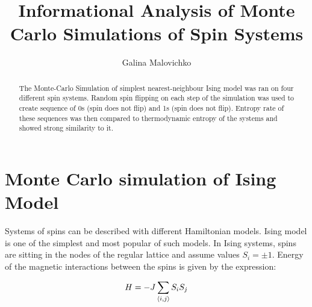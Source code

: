 \documentclass{llncs}
\begin{document}
\title{Informational Analysis of Monte Carlo Simulations of Spin Systems}
%
%
\author{Galina Malovichko}
%
%
%

\maketitle              %

\begin{abstract}
The Monte-Carlo Simulation of simplest nearest-neighbour Ising model was ran on four different spin systems. Random spin flipping on each step of the simulation was used to create sequence of 0s (spin does not flip) and 1s (spin does not flip). Entropy rate of these sequences was then compared to thermodynamic entropy of the systems and showed strong similarity to it.
\end{abstract}
%
\section{Monte Carlo simulation of Ising Model}
%
Systems of spins can be described with different Hamiltonian models. Ising model is one of the simplest and most popular of such models.
In Ising systems, spins are sitting in the nodes of the regular lattice and assume values $S_i = \pm 1$. Energy of the magnetic interactions between the spins is given by the expression:

\begin{equation}
 H = -J \sum_{\langle i, j \rangle}{S_i S_j}\\
 \label{eq:one}
\end{equation}
\end{document}
